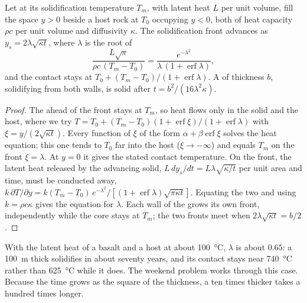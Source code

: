 \begin{proposition}\label{prop:b2:magma-emplacement:stefan}
Let  at its solidification temperature $T_m$, with latent heat $L$ per unit
volume, fill the space $y > 0$ beside a host rock at $T_0$ occupying $y < 0$, both
of heat capacity $\rho c$ per unit volume and diffusivity $\kappa$. The
solidification front advances as $y_s = 2\lambda\sqrt{\kappa t}$, where $\lambda$
is the root of
\[
\frac{L\sqrt\pi}{\rho c\,(T_m - T_0)} = \frac{e^{-\lambda^2}}{\lambda\,(1 + \operatorname{erf}\lambda)},
\]
and the contact stays at $T_0 + (T_m - T_0)/(1 + \operatorname{erf}\lambda)$. A 
of thickness $b$, solidifying from both walls, is solid after
$t = b^2/(16\lambda^2\kappa)$.
\end{proposition}

\begin{proof}
The  ahead of the front stays at $T_m$, so heat flows only in the solid
and the host, where we try $T = T_0 + (T_m - T_0)(1 + \operatorname{erf}\xi)/(1 +
\operatorname{erf}\lambda)$ with $\xi = y/(2\sqrt{\kappa t})$. Every function of $\xi$
of the form $\alpha + \beta\operatorname{erf}\xi$ solves the heat equation; this one
tends to $T_0$ far into the host ($\xi \to -\infty$) and equals $T_m$ on the front
$\xi = \lambda$. At $y = 0$ it gives the stated contact temperature. On the front,
the latent heat released by the advancing solid, $L\,dy_s/dt = L\lambda\sqrt{\kappa/t}$
per unit area and time, must be conducted away, $k\,\partial T/\partial y = k(T_m -
T_0)\,e^{-\lambda^2}/[(1 + \operatorname{erf}\lambda)\sqrt{\pi\kappa t}]$. Equating the
two and using $k = \rho c\kappa$ gives the equation for $\lambda$. Each wall of the
 grows its own front, independently while the core stays at $T_m$; the two
fronts meet when $2\lambda\sqrt{\kappa t} = b/2$.
\end{proof}

With the latent heat of a basalt and a host at about \qty{100}{\celsius},
$\lambda$ is about $0.65$: a  \qty{100}{m} thick solidifies in about
seventy years, and its contact stays near \qty{740}{\celsius} rather than
\qty{625}{\celsius} while it does. The weekend problem works through this case.
Because the time grows as the square of the thickness, a  ten times thicker
takes a hundred times longer.

